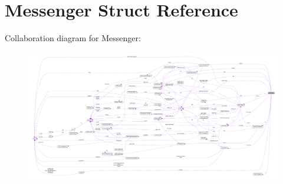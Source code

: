 \hypertarget{struct_messenger}{\section{Messenger Struct Reference}
\label{struct_messenger}
}


Collaboration diagram for Messenger\+:
\nopagebreak
\begin{figure}[H]
\begin{center}
\leavevmode
\includegraphics[width=350pt]{struct_messenger__coll__graph}
\end{center}
\end{figure}
